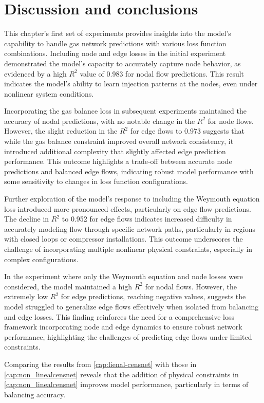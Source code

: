 \section{Discussion and conclusions}


This chapter's first set of experiments provides insights into the model's capability to handle gas network predictions with various loss function combinations. Including node and edge losses in the initial experiment demonstrated the model's capacity to accurately capture node behavior, as evidenced by a high $R^2$ value of 0.983 for nodal flow predictions. This result indicates the model's ability to learn injection patterns at the nodes, even under nonlinear system conditions.

Incorporating the gas balance loss in subsequent experiments maintained the accuracy of nodal predictions, with no notable change in the $R^2$ for node flows. However, the slight reduction in the $R^2$ for edge flows to 0.973 suggests that while the gas balance constraint improved overall network consistency, it introduced additional complexity that slightly affected edge prediction performance. This outcome highlights a trade-off between accurate node predictions and balanced edge flows, indicating robust model performance with some sensitivity to changes in loss function configurations.

Further exploration of the model's response to including the Weymouth equation loss introduced more pronounced effects, particularly on edge flow predictions. The decline in $R^2$ to 0.952 for edge flows indicates increased difficulty in accurately modeling flow through specific network paths, particularly in regions with closed loops or compressor installations. This outcome underscores the challenge of incorporating multiple nonlinear physical constraints, especially in complex configurations.

In the experiment where only the Weymouth equation and node losses were considered, the model maintained a high $R^2$ for nodal flows. However, the extremely low $R^2$ for edge predictions, reaching negative values, suggests the model struggled to generalize edge flows effectively when isolated from balancing and edge losses. This finding reinforces the need for a comprehensive loss framework incorporating node and edge dynamics to ensure robust network performance, highlighting the challenges of predicting edge flows under limited constraints.

Comparing the results from \cref{cap:lienal-censnet} with those in \cref{cap:non_linealcensnet} reveals that the addition of physical constraints in \cref{cap:non_linealcensnet} improves model performance, particularly in terms of balancing accuracy.


